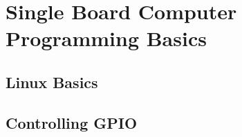 \chapter{Single Board Computer Programming Basics}

\section{Linux Basics}

\section{Controlling GPIO}





